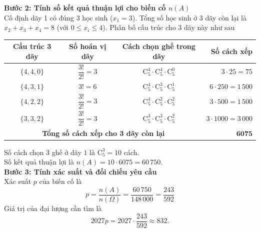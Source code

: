 \begin{ex}
{\begin{center}
\begin{tabular}{|c|c|c|r|}
			\end{tabular}
		\end{center}
		\textbf{Bước 2: Tính số kết quả thuận lợi cho biến cố $n(A)$}\\
		Cố định dãy 1 có đúng $3$ học sinh ($x_1 = 3$). Tổng số học sinh ở $3$ dãy còn lại là $x_2 + x_3 + x_4 = 8$ (với $0 \le x_i \le 4$). Phân bố cấu trúc cho $3$ dãy này như sau
		\begin{center}
			\renewcommand{\arraystretch}{1.75}
			\begin{tabular}{|c|c|c|r|}
				\hline
				\textbf{Cấu trúc 3 dãy} & \textbf{Số hoán vị dãy} & \textbf{Cách chọn ghế trong dãy} & \textbf{Số cách xếp} \\ \hline
				$\{4, 4, 0\}$ & $\dfrac{3!}{2!} = 3$ & $\mathrm{C}_5^4 \cdot \mathrm{C}_5^4 \cdot \mathrm{C}_5^0$ & $3 \cdot 25 = 75$ \\ \hline
				$\{4, 3, 1\}$ & $3! = 6$ & $\mathrm{C}_5^4 \cdot \mathrm{C}_5^3 \cdot \mathrm{C}_5^1$ & $6 \cdot 250 = 1\,500$ \\ \hline
				$\{4, 2, 2\}$ & $\dfrac{3!}{2!} = 3$ & $\mathrm{C}_5^4 \cdot \mathrm{C}_5^2 \cdot \mathrm{C}_5^2$ & $3 \cdot 500 = 1\,500$ \\ \hline
				$\{3, 3, 2\}$ & $\dfrac{3!}{2!} = 3$ & $\mathrm{C}_5^3 \cdot \mathrm{C}_5^3 \cdot \mathrm{C}_5^2$ & $3 \cdot 1000 = 3\,000$ \\ \hline
				\multicolumn{3}{|c|}{\textbf{Tổng số cách xếp cho 3 dãy còn lại}} & $\mathbf{6075}$ \\ \hline
			\end{tabular}
		\end{center}
		Số cách chọn $3$ ghế ở dãy $1$ là $\mathrm{C}_5^3 = 10$ cách.\\
		Số kết quả thuận lợi là $n(A) = 10 \cdot 6075 = 60\,750$.\\
		\textbf{Bước 3: Tính xác suất và đối chiếu yêu cầu}\\
		Xác suất $p$ của biến cố là
		$$p = \dfrac{n(A)}{n(\Omega)} = \dfrac{60\,750}{148\,000} = \dfrac{243}{592}$$
		Giá trị của đại lượng cần tìm là
		$$2027p = 2027 \cdot \dfrac{243}{592} \approx 832.$$
	}
\end{ex}